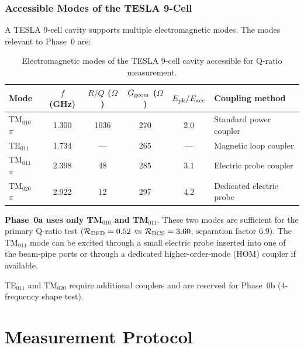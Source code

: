 \documentclass[11pt]{article}
\theoremstyle{definition}
\theoremstyle{remark}
\begin{document}
\section{Accessible Modes of the TESLA 9-Cell}
\label{sec:modes}

A TESLA 9-cell cavity supports multiple electromagnetic modes.
The modes relevant to Phase~0 are:

\begin{table}[H]
\centering
\caption{Electromagnetic modes of the TESLA 9-cell cavity accessible
for Q-ratio measurement.}
\label{tab:modes}
\renewcommand{\arraystretch}{1.25}
\begin{tabular}{@{}lccccl@{}}
\toprule
\textbf{Mode} & \textbf{$f$ (GHz)} & \textbf{$R/Q$ ($\Omega$)}
& \textbf{$G_{\rm geom}$ ($\Omega$)} & \textbf{$E_{\rm pk}/E_{\rm acc}$}
& \textbf{Coupling method} \\
\midrule
TM$_{010}$ $\pi$ & 1.300 & 1036 & 270 & 2.0
  & Standard power coupler \\
TE$_{011}$ & 1.734 & --- & 265 & ---
  & Magnetic loop coupler \\
TM$_{011}$ $\pi$ & 2.398 & 48 & 285 & 3.1
  & Electric probe coupler \\
TM$_{020}$ $\pi$ & 2.922 & 12 & 297 & 4.2
  & Dedicated electric probe \\
\bottomrule
\end{tabular}
\end{table}

\textbf{Phase~0a uses only TM$_{010}$ and TM$_{011}$}. These two
modes are sufficient for the primary Q-ratio test
($\mathcal{R}_{\rm DFD} = 0.52$ vs $\mathcal{R}_{\rm BCS} = 3.60$,
separation factor 6.9). The TM$_{011}$ mode can be excited through
a small electric probe inserted into one of the beam-pipe ports or
through a dedicated higher-order-mode (HOM) coupler if available.

TE$_{011}$ and TM$_{020}$ require additional couplers and are
reserved for Phase~0b (4-frequency shape test).


\part{Measurement Protocol}
\label{sec:protocol}
\end{document}
